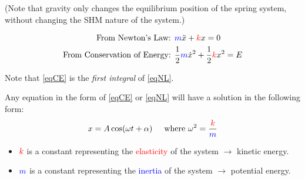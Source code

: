 \documentclass[11pt,letterpaper,titlepage,oneside]{book}
\begin{document}
(Note that gravity only changes the equilibrium position of the spring system, without changing the SHM nature of the system.)

\begin{align}
\text{From Newton's Law: }&
	\textcolor{blue}{m}\ddot{x} + \textcolor{red}{k}x = 0 \label{eqNL} \\
\text{From Conservation of Energy: }&
	\frac{1}{2}\textcolor{blue}{m}\dot{x}^2 + \frac{1}{2}\textcolor{red}{k}x^2 = E \label{eqCE}
\end{align}

Note that \eqref{eqCE} is the \textit{first integral} of  \eqref{eqNL}.

Any equation in the form of \eqref{eqCE} or \eqref{eqNL} will have a solution in the following form:
\[x = A \cos(\omega t+\alpha)\hspace{0.5cm}\text{where }\omega^2 = \frac{\color{red}{k}}{\color{blue}m}\]

\begin{itemize}
	\item $\color{red}k$ is a constant representing the \textcolor{red}{elasticity} of the system $\longrightarrow$ kinetic energy.
	\item $\color{blue}m$ is a constant representing the \textcolor{blue}{inertia} of the system $\longrightarrow$ potential energy.
\end{itemize}
\end{document}
